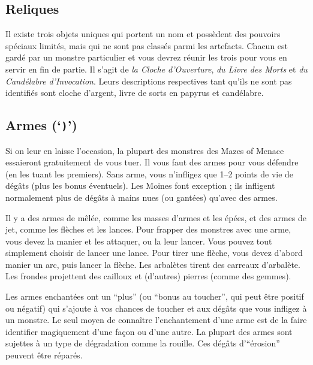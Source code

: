 \documentclass[titlepage]{article}
\begin{document}
\subsection*{Reliques}

Il existe trois objets uniques qui portent un nom et possèdent des pouvoirs
spéciaux limités, mais qui ne sont pas classés parmi les artefacts.
Chacun est gardé par un monstre particulier et vous devrez réunir les
trois pour vous en servir en fin de partie.
Il s'agit de \textit{la Cloche d'Ouverture},
\textit{du Livre des Morts} et
\textit{du Candélabre d'Invocation}.
Leurs descriptions respectives tant qu'ils ne sont pas identifiés sont
cloche d'argent, livre de sorts en papyrus et candélabre.

\subsection*{Armes (`\texttt{)}')}

Si on leur en laisse l'occasion, la plupart des monstres des Mazes of
Menace essaieront gratuitement de vous tuer.
Il vous faut des armes pour vous défendre (en les tuant les premiers).
Sans
arme, vous n'infligez que 1--2 points de vie de dégâts (plus les bonus éventuels).
Les Moines font exception ; ils infligent normalement plus de dégâts à mains
nues (ou gantées) qu'avec des armes.

Il y a des armes de mêlée, comme les masses d'armes et les épées, et des armes
de jet, comme les flèches et les lances.  Pour frapper des monstres avec une arme,
vous devez la manier et les attaquer, ou la leur lancer.  Vous pouvez tout
simplement choisir de lancer une lance.
Pour tirer une flèche, vous devez d'abord manier un arc, puis lancer la flèche.
Les arbalètes tirent des carreaux d'arbalète.  Les frondes projettent des cailloux
et (d'autres) pierres (comme des gemmes).

Les armes enchantées ont un ``plus'' (ou ``bonus au toucher'', qui peut être
positif ou négatif) qui s'ajoute à vos chances de
toucher et aux dégâts que vous infligez à un monstre.  Le seul moyen de connaître
l'enchantement d'une arme est de la faire identifier magiquement d'une façon ou d'une autre.
La plupart des armes sont sujettes à un type de dégradation comme la rouille.  Ces
dégâts d'``érosion'' peuvent être réparés.
\end{document}
